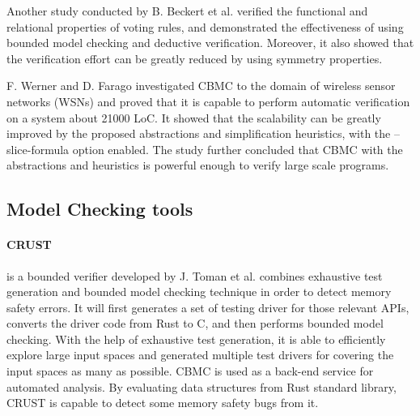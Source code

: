 Another study conducted by B. Beckert et al. \cite{beckertBormerKirsten2016} verified the functional and relational properties of voting rules, and demonstrated the effectiveness of using bounded model checking and deductive verification. Moreover, it also showed that the verification effort can be greatly reduced by using symmetry properties. 

F. Werner and D. Farago \cite{Werner2010CorrectnessOS} investigated CBMC to the domain of wireless sensor networks (WSNs) and proved that it is capable to perform automatic verification on a system about 21000 LoC. It showed that the scalability can be greatly improved by the proposed abstractions and simplification heuristics, with the --slice-formula option enabled. The study further concluded that CBMC with the abstractions and heuristics is powerful enough to verify large scale programs. 

\subsection{Model Checking tools}
\paragraph{CRUST} is a bounded verifier developed by J. Toman et al. \cite{7371997} combines exhaustive test generation and bounded model checking technique in order to detect memory safety errors. It will first generates a set of testing driver for those relevant APIs, converts the driver code from Rust to C, and then performs bounded model checking. With the help of exhaustive test generation, it is able to efficiently explore large input spaces and generated multiple test drivers for covering the input spaces as many as possible. CBMC is used as a back-end service for automated analysis. By evaluating data structures from Rust standard library, CRUST is capable to detect some memory safety bugs from it.





